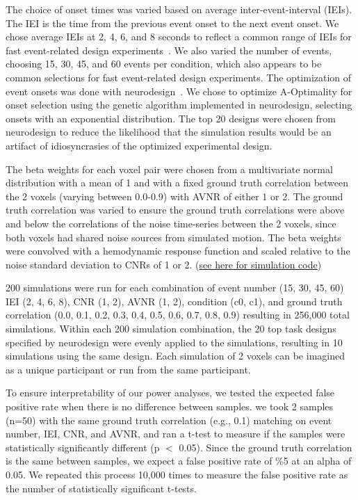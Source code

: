 \documentclass[phd,appendix,figures]{uithesis}
\begin{document}
The choice of onset times was varied based on average inter-event-interval (IEIs).
The IEI is the time from the previous event onset to the next event onset.
We chose average IEIs at 2, 4, 6, and 8 seconds to reflect a common range of IEIs
for fast event-related design experiments~\cite{Hennigan2015,Dichter2007,Goghari2009}.
We also varied the number of events, choosing 15, 30, 45, and 60 events per condition,
which also appears to be common selections for fast event-related design experiments.
The optimization of event onsets was done with neurodesign~\cite{Durnez2018}.
We chose to optimize A-Optimality for onset selection using the genetic algorithm implemented
in neurodesign, selecting onsets with an exponential distribution.
The top 20 designs were chosen from neurodesign to reduce the likelihood
that the simulation results would be an artifact of idiosyncrasies
of the optimized experimental design.

The beta weights for each voxel pair were chosen from a multivariate normal distribution
with a mean of 1 and with a fixed ground truth correlation between the 2 voxels 
(varying between 0.0-0.9) with AVNR of either 1 or 2.
The ground truth correlation was varied to ensure the ground truth correlations were above
and below the correlations of the noise time-series between the 2 voxels,
since both voxels had shared noise sources from simulated motion.
The beta weights were convolved with a hemodynamic response function and scaled
relative to the noise standard deviation to CNRs of 1 or 2.
(\href{https://github.com/jdkent/betaSeriesSimulations/tree/34bf1ff5b05c0eeae855f0e8e1267765bf14999a/beta_sim}{see here for simulation code})

200 simulations were run for each combination of event number
(15, 30, 45, 60) IEI (2, 4, 6, 8),  CNR (1, 2), AVNR (1, 2), condition (c0, c1),
and ground truth correlation
(0.0, 0.1, 0.2, 0.3, 0.4, 0.5, 0.6, 0.7, 0.8, 0.9)
resulting in 256,000 total simulations.
Within each 200 simulation combination, the 20 top task designs specified by
neurodesign were evenly applied to the simulations, resulting in 10 simulations
using the same design.
Each simulation of 2 voxels can be imagined as a unique participant or run from
the same participant.

To ensure interpretability of our power analyses, we tested
the expected false positive rate when there is no difference between samples.
we took 2 samples (n=50) with the same ground truth correlation (e.g., 0.1)
matching on event number, IEI, CNR, and AVNR, and ran a t-test to measure if the samples
were statistically significantly different (p $<$ 0.05).
Since the ground truth correlation is the same between samples,
we expect a false positive rate of \%5 at an alpha of 0.05.
We repeated this process 10,000 times to measure the false positive rate as
the number of statistically significant t-tests.
\end{document}
